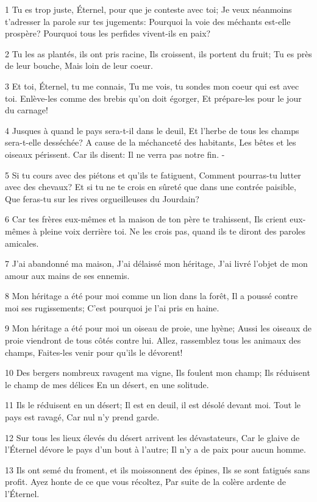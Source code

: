 \par 1 Tu es trop juste, Éternel, pour que je conteste avec toi; Je veux néanmoins t'adresser la parole sur tes jugements: Pourquoi la voie des méchants est-elle prospère? Pourquoi tous les perfides vivent-ils en paix?
\par 2 Tu les as plantés, ils ont pris racine, Ils croissent, ils portent du fruit; Tu es près de leur bouche, Mais loin de leur coeur.
\par 3 Et toi, Éternel, tu me connais, Tu me vois, tu sondes mon coeur qui est avec toi. Enlève-les comme des brebis qu'on doit égorger, Et prépare-les pour le jour du carnage!
\par 4 Jusques à quand le pays sera-t-il dans le deuil, Et l'herbe de tous les champs sera-t-elle desséchée? A cause de la méchanceté des habitants, Les bêtes et les oiseaux périssent. Car ils disent: Il ne verra pas notre fin. -
\par 5 Si tu cours avec des piétons et qu'ils te fatiguent, Comment pourras-tu lutter avec des chevaux? Et si tu ne te crois en sûreté que dans une contrée paisible, Que feras-tu sur les rives orgueilleuses du Jourdain?
\par 6 Car tes frères eux-mêmes et la maison de ton père te trahissent, Ils crient eux-mêmes à pleine voix derrière toi. Ne les crois pas, quand ils te diront des paroles amicales.
\par 7 J'ai abandonné ma maison, J'ai délaissé mon héritage, J'ai livré l'objet de mon amour aux mains de ses ennemis.
\par 8 Mon héritage a été pour moi comme un lion dans la forêt, Il a poussé contre moi ses rugissements; C'est pourquoi je l'ai pris en haine.
\par 9 Mon héritage a été pour moi un oiseau de proie, une hyène; Aussi les oiseaux de proie viendront de tous côtés contre lui. Allez, rassemblez tous les animaux des champs, Faites-les venir pour qu'ils le dévorent!
\par 10 Des bergers nombreux ravagent ma vigne, Ils foulent mon champ; Ils réduisent le champ de mes délices En un désert, en une solitude.
\par 11 Ils le réduisent en un désert; Il est en deuil, il est désolé devant moi. Tout le pays est ravagé, Car nul n'y prend garde.
\par 12 Sur tous les lieux élevés du désert arrivent les dévastateurs, Car le glaive de l'Éternel dévore le pays d'un bout à l'autre; Il n'y a de paix pour aucun homme.
\par 13 Ils ont semé du froment, et ils moissonnent des épines, Ils se sont fatigués sans profit. Ayez honte de ce que vous récoltez, Par suite de la colère ardente de l'Éternel.
